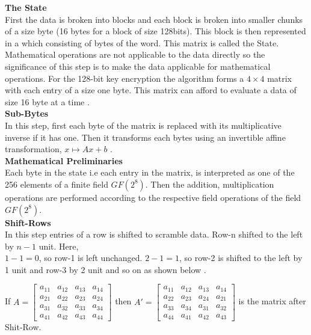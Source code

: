 \documentclass[a4paper,twoside,10pt]{article}
\theoremstyle{plain}
\theoremstyle{definition}
\begin{document}
\noindent
\textbf{The State}\\[1mm]
First the data is broken into blocks and each block is broken into smaller chunks of a size byte (16 bytes for a block of size 128bits). This block is then represented in a  which consisting of bytes of the word. This matrix is called the State. Mathematical operations are not applicable to the data directly so the significance of this step is to make the data applicable for mathematical operations. For the 128-bit key encryption the algorithm forms a \(4 \times 4\) matrix with each entry of a size one byte. This matrix can afford to evaluate a data of size 16 byte at a time \cite{aes}.\\[2mm]

\noindent
\textbf{Sub-Bytes}\\[1mm]
In this step, first each byte of the matrix is replaced with its multiplicative inverse if it has one. Then it transforms each bytes using an invertible affine transformation, \(x \mapsto Ax+b\) \cite{aes}.\\[2mm]

\noindent
\textbf{Mathematical Preliminaries}\\[1mm]
Each byte in the state i.e each entry in the matrix, is interpreted as one of the 256 elements of a finite field \(GF(2^8)\). Then the addition, multiplication operations are performed according to the respective field operations of the field \(GF(2^8)\). \\[2mm]

\noindent
\textbf{Shift-Rows}\\[1mm]
In this step entries of a row is shifted to scramble data. Row-n shifted to the left by \(n-1\) unit. Here,\\
\(1-1=0\), so row-1 is left unchanged. \(2-1=1\), so row-2 is shifted to the left by 1 unit and row-3 by 2 unit and so on as shown below \cite{aes}.

If \(A=\begin{bmatrix}
    a_{11}&a_{12}&a_{13}&a_{14}\\
    a_{21}&a_{22}&a_{23}&a_{24}\\
    a_{31}&a_{32}&a_{33}&a_{34}\\
    a_{41}&a_{42}&a_{43}&a_{44}
    \end{bmatrix}\) \hspace{3mm} then \(A'=\begin{bmatrix}
    a_{11}&a_{12}&a_{13}&a_{14}\\
    a_{22}&a_{23}&a_{24}&a_{21}\\
    a_{33}&a_{34}&a_{31}&a_{32}\\
    a_{44}&a_{41}&a_{42}&a_{43}
  \end{bmatrix}\)  is the matrix after Shit-Row.\\[2mm]
\end{document}
